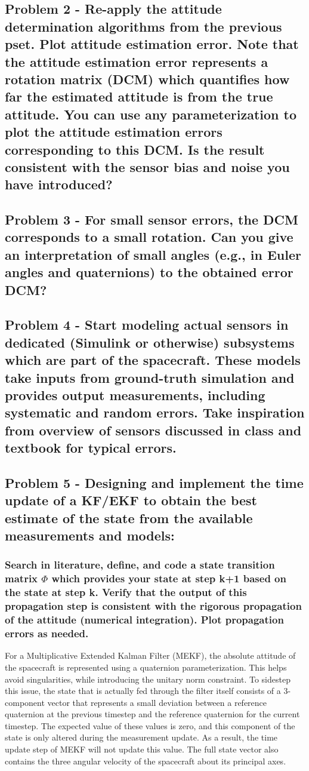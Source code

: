 \subsection{Problem 2 - Re-apply the attitude determination algorithms from the previous pset. Plot attitude estimation error. Note that the attitude estimation error represents a rotation matrix (DCM) which quantifies how far the estimated
attitude is from the true attitude. You can use any parameterization to plot the attitude estimation errors corresponding to this DCM. Is the result consistent with the sensor bias and noise you have introduced?}


\subsection{Problem 3 - For small sensor errors, the DCM corresponds to a small rotation. Can you give an interpretation of small angles (e.g., in Euler angles and quaternions) to the obtained error DCM?}

\subsection{Problem 4 - Start modeling actual sensors in dedicated (Simulink or otherwise) subsystems which are part of the spacecraft. These models take inputs from ground-truth simulation and provides output measurements, including systematic and random errors. Take inspiration from overview of sensors discussed in class and
textbook for typical errors.}

\subsection{Problem 5 - Designing and implement the time update of a KF/EKF to obtain the best estimate of the state from the available measurements and models:}

\subsubsection{Search in literature, define, and code a state transition matrix $\Phi$ which provides your state at step k+1 based on the state at step k. Verify that the output of this propagation step is consistent with the rigorous propagation of the attitude (numerical integration). Plot propagation errors as needed.}

For a Multiplicative Extended Kalman Filter (MEKF), the absolute attitude of the spacecraft is represented using a quaternion parameterization. This helps avoid singularities, while introducing the unitary norm constraint. To sidestep this issue, the state that is actually fed through the filter itself consists of a 3-component vector that represents a small deviation between a reference quaternion at the previous timestep and the reference quaternion for the current timestep. The expected value of these values is zero, and this component of the state is only altered during the measurement update. As a result, the time update step of MEKF will not update this value. The full state vector also contains the three angular velocity of the spacecraft about its principal axes. 

